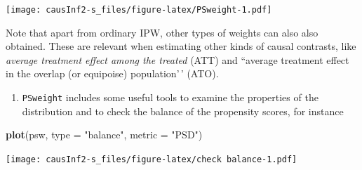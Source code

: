 \documentclass[
]{book}
\newenvironment{Shaded}{\begin{snugshade}}{\end{snugshade}}
\newcommand{\AttributeTok}[1]{\textcolor[rgb]{0.13,0.29,0.53}{#1}}
\newcommand{\CommentTok}[1]{\textcolor[rgb]{0.56,0.35,0.01}{\textit{#1}}}
\newcommand{\DecValTok}[1]{\textcolor[rgb]{0.00,0.00,0.81}{#1}}
\newcommand{\FunctionTok}[1]{\textcolor[rgb]{0.13,0.29,0.53}{\textbf{#1}}}
\newcommand{\NormalTok}[1]{#1}
\newcommand{\OtherTok}[1]{\textcolor[rgb]{0.56,0.35,0.01}{#1}}
\newcommand{\SpecialCharTok}[1]{\textcolor[rgb]{0.81,0.36,0.00}{\textbf{#1}}}
\newcommand{\StringTok}[1]{\textcolor[rgb]{0.31,0.60,0.02}{#1}}
\providecommand{\tightlist}{%
  \setlength{\itemsep}{0pt}\setlength{\parskip}{0pt}}
\begin{document}
\begin{Shaded}
\end{Shaded}

\texttt{[image: causInf2-s\_files/figure-latex/PSweight-1.pdf]}

Note that apart from ordinary IPW, other types of weights can also also
obtained. These are relevant when estimating other kinds of causal
contrasts, like \emph{average treatment effect among the treated} (ATT) and
``average treatment effect in the overlap (or equipoise) population'\,'
(ATO).

\begin{enumerate}
\def\labelenumi{\arabic{enumi}.}
\setcounter{enumi}{1}
\tightlist
\item
  \texttt{PSweight} includes some useful tools to examine the properties of
  the distribution and to check the balance of the propensity scores,
  for instance
\end{enumerate}

\begin{Shaded}
\begin{Highlighting}[]
\FunctionTok{plot}\NormalTok{(psw, }\AttributeTok{type =} \StringTok{"balance"}\NormalTok{, }\AttributeTok{metric =} \StringTok{"PSD"}\NormalTok{)}
\end{Highlighting}
\end{Shaded}

\texttt{[image: causInf2-s\_files/figure-latex/check balance-1.pdf]}
\end{document}
